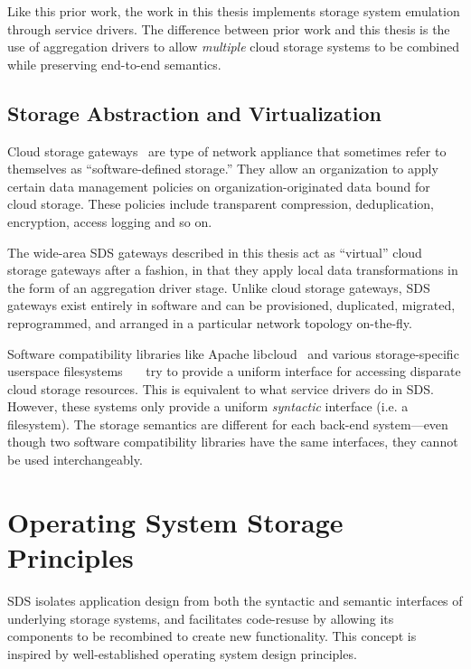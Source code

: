 Like this prior work, the work in this thesis implements storage system emulation
through service drivers.  The difference between prior work and this thesis is
the use of aggregation drivers to allow \emph{multiple} cloud storage systems to
be combined while preserving end-to-end semantics.

\subsection{Storage Abstraction and Virtualization}

Cloud storage gateways~\cite{cloud-storage-gateway} are type of
network appliance that sometimes refer to themselves as ``software-defined storage.''
They allow an organization to apply certain data management
policies on organization-originated data bound for cloud storage.  These
policies include transparent compression, deduplication, encryption, access
logging and so on.

The wide-area SDS gateways described in this thesis act as ``virtual'' cloud
storage gateways after a fashion, in that they apply local data transformations in the form of
an aggregation driver stage.  Unlike cloud storage gateways, SDS gateways exist
entirely in software and can be provisioned, duplicated, migrated,
reprogrammed, and arranged in a particular network topology on-the-fly.

Software compatibility libraries like Apache libcloud~\cite{libcloud} and various
storage-specific userspace
filesystems~\cite{s3fs}~\cite{dropbox}~\cite{google-drive-fs} try to
provide a uniform interface for accessing disparate cloud storage resources.
This is equivalent to what service drivers do in SDS.  However, these systems only provide a uniform
\emph{syntactic} interface (i.e. a filesystem).  The storage semantics are
different for each back-end system---even though two software compatibility libraries have the same
interfaces, they cannot be used interchangeably.

\section{Operating System Storage Principles}

SDS isolates application design from both the syntactic and semantic interfaces
of underlying storage systems, and facilitates code-resuse by allowing
its components to be recombined to create new functionality.  This concept is
inspired by well-established operating system design principles.

